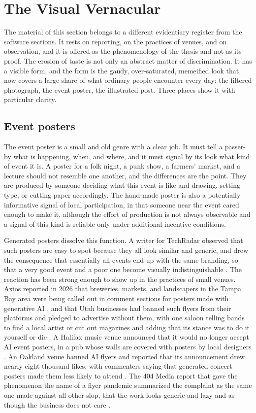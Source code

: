 \documentclass[11pt,a4paper]{article}
\theoremstyle{remark}
\begin{document}
\section{The Visual Vernacular}

The material of this section belongs to a different evidentiary register from the software sections. It rests on reporting, on the practices of venues, and on observation, and it is offered as the phenomenology of the thesis and not as its proof. The erosion of taste is not only an abstract matter of discrimination. It has a visible form, and the form is the gaudy, over-saturated, memeified look that now covers a large share of what ordinary people encounter every day: the filtered photograph, the event poster, the illustrated post. Three places show it with particular clarity.

\subsection{Event posters}

The event poster is a small and old genre with a clear job. It must tell a passer-by what is happening, when, and where, and it must signal by its look what kind of event it is. A poster for a folk night, a punk show, a farmers' market, and a lecture should not resemble one another, and the differences are the point. They are produced by someone deciding what this event is like and drawing, setting type, or cutting paper accordingly. The hand-made poster is also a potentially informative signal of local participation, in that someone near the event cared enough to make it, although the effort of production is not always observable and a signal of this kind is reliable only under additional incentive conditions.

Generated posters dissolve this function. A writer for TechRadar observed that such posters are easy to spot because they all look similar and generic, and drew the consequence that essentially all events end up with the same branding, so that a very good event and a poor one become visually indistinguishable \cite{TechRadarSlop2026}. The reaction has been strong enough to show up in the practices of small venues. Axios reported in 2026 that breweries, markets, and landscapers in the Tampa Bay area were being called out in comment sections for posters made with generative AI \cite{AxiosTampa2026}, and that Utah businesses had banned such flyers from their platforms and pledged to advertise without them, with one saloon telling bands to find a local artist or cut out magazines and adding that its stance was to do it yourself or die \cite{AxiosUtah2026}. A Halifax music venue announced that it would no longer accept AI event posters, in a pub whose walls are covered with posters by local designers \cite{GlobalGus}. An Oakland venue banned AI flyers and reported that its announcement drew nearly eight thousand likes, with commenters saying that generated concert posters made them less likely to attend \cite{CoAI2026}. The 404 Media report that gave the phenomenon the name of a flyer pandemic summarized the complaint as the same one made against all other slop, that the work looks generic and lazy and as though the business does not care \cite{404Flyer}.
\end{document}
